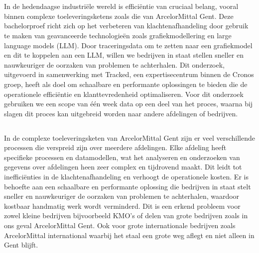 
\chapter{}%
\label{ch:inleiding}

In de hedendaagse industriële wereld is efficiëntie van cruciaal belang, vooral binnen complexe toeleveringsketens zoals die van ArcelorMittal Gent. 
Deze bachelorproef richt zich op het verbeteren van klachtenafhandeling door gebruik te maken van geavanceerde technologieën zoals grafiekmodellering en large language models (LLM). 
Door traceringsdata om te zetten naar een grafiekmodel en dit te koppelen aan een LLM, willen we bedrijven in staat stellen sneller en nauwkeuriger de oorzaken van problemen te achterhalen. 
Dit onderzoek, uitgevoerd in samenwerking met Tracked, een expertisecentrum binnen de Cronos groep, heeft als doel om schaalbare en performante oplossingen te bieden die de operationele efficiëntie en klanttevredenheid optimaliseren.
Voor dit onderzoek gebruiken we een scope van één week data op een deel van het proces, waarna bij slagen dit proces kan uitgebreid worden naar andere afdelingen of bedrijven.

\section{}%
\label{sec:probleemstelling}

In de complexe toeleveringsketen van ArcelorMittal Gent zijn er veel verschillende processen die verspreid zijn over meerdere afdelingen. 
Elke afdeling heeft specifieke processen en datamodellen, wat het analyseren en onderzoeken van gegevens over afdelingen heen zeer complex en tijdrovend maakt. 
Dit leidt tot inefficiënties in de klachtenafhandeling en verhoogt de operationele kosten. 
Er is behoefte aan een schaalbare en performante oplossing die bedrijven in staat stelt sneller en nauwkeuriger de oorzaken van problemen te achterhalen, waardoor kostbaar handmatig werk wordt verminderd.
Dit is een erkend probleem voor zowel kleine bedrijven bijvoorbeeld KMO's of delen van grote bedrijven zoals in ons geval ArcelorMittal Gent. Ook voor grote internationale bedrijven zoals ArcelorMittal international waarbij het staal een grote weg aflegt en niet alleen in Gent blijft.


